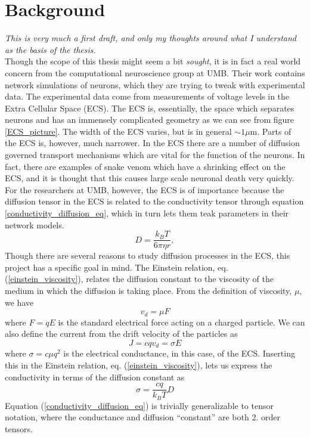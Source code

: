 \section{Background}
\emph{This is very much a first draft, and only my thoughts around what I understand as the basis of the thesis.}\\
Though the scope of this thesis might seem a bit \emph{sought}, it is in fact a real world concern from the computational neuroscience group at UMB. 
Their work contains network simulations of neurons, which they are trying to tweak with experimental data. 
The experimental data come from measurements of voltage levels in the Extra Cellular Space (ECS). 
The ECS is, essentially, the space which separates neurons and has an immensely complicated geometry as we can see from figure \ref{ECS_picture}. 
The width of the ECS varies, but is in general $\sim1\mu$m. 
Parts of the ECS is, however, much narrower. In the ECS there are a number of diffusion governed transport mechanisms which are vital for the function of the neurons. 
In fact, there are examples of snake venom which have a shrinking effect on the ECS, and it is thought that this causes large scale neuronal death very quickly. 
For the researchers at UMB, however, the ECS is of importance because the diffusion tensor in the ECS is related to the conductivity tensor through equation \ref{conductivity_diffusion_eq}, which in turn lets them teak parameters in their network models. \\
\begin{equation}\label{einstein_viscosity}
D = \frac{k_B T}{6\pi \eta r},
\end{equation}
Though there are several reasons to study diffusion processes in the ECS, this project has a specific goal in mind. 
The Einstein relation, eq. (\ref{einstein_viscosity}), relates the diffusion constant to the viscosity of the medium in which the diffusion is taking place. 
From the definition of viscosity, $\mu$, we have 
\begin{equation}
v_d = \mu F 
\end{equation}
where $F = qE$ is the standard electrical force acting on a charged particle. 
We can also define the current from the drift velocity of the particles as 
\begin{equation}
J = cqv_d = \sigma E 
\end{equation}
where $\sigma = c\mu q^2$ is the electrical conductance, in this case, of the ECS. 
Inserting this in the Einstein relation, eq. (\ref{einstein_viscosity}), lets us express the conductivity in terms of the diffusion constant as 
\begin{equation}\label{conductivity_diffusion_eq}
\sigma = \frac{cq}{k_B T}D 
\end{equation}
Equation (\ref{conductivity_diffusion_eq}) is trivially generalizable to tensor notation, where the conductance and diffusion ``constant'' are both 2. order tensors.\\

